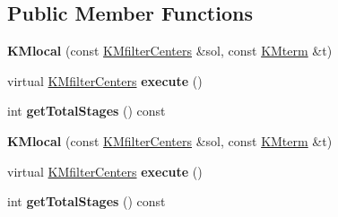 \subsection*{Public Member Functions}
\begin{DoxyCompactItemize}
\item 
\hypertarget{class_k_mlocal_abf89cdf454fe09086a6f1eab687bfd5f}{
{\bfseries KMlocal} (const \hyperlink{class_k_mfilter_centers}{KMfilterCenters} \&sol, const \hyperlink{class_k_mterm}{KMterm} \&t)}
\label{class_k_mlocal_abf89cdf454fe09086a6f1eab687bfd5f}

\item 
\hypertarget{class_k_mlocal_aefc61f953523e968e6dec6d8f13474f0}{
virtual \hyperlink{class_k_mfilter_centers}{KMfilterCenters} {\bfseries execute} ()}
\label{class_k_mlocal_aefc61f953523e968e6dec6d8f13474f0}

\item 
\hypertarget{class_k_mlocal_af4bded72d30f8cf1ea8929a2f774c03f}{
int {\bfseries getTotalStages} () const }
\label{class_k_mlocal_af4bded72d30f8cf1ea8929a2f774c03f}

\item 
\hypertarget{class_k_mlocal_abf89cdf454fe09086a6f1eab687bfd5f}{
{\bfseries KMlocal} (const \hyperlink{class_k_mfilter_centers}{KMfilterCenters} \&sol, const \hyperlink{class_k_mterm}{KMterm} \&t)}
\label{class_k_mlocal_abf89cdf454fe09086a6f1eab687bfd5f}

\item 
\hypertarget{class_k_mlocal_a74ba08b0944a5d355283f6ffdf8e913c}{
virtual \hyperlink{class_k_mfilter_centers}{KMfilterCenters} {\bfseries execute} ()}
\label{class_k_mlocal_a74ba08b0944a5d355283f6ffdf8e913c}

\item 
\hypertarget{class_k_mlocal_af4bded72d30f8cf1ea8929a2f774c03f}{
int {\bfseries getTotalStages} () const }
\label{class_k_mlocal_af4bded72d30f8cf1ea8929a2f774c03f}

\end{DoxyCompactItemize}
